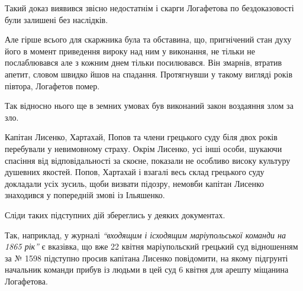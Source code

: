 \documentclass[a4paper,20pt]{report}
\begin{document}
Такий доказ виявився звісно недостатнім і скарги Логафетова по бездоказовості були залишені
без наслідків.

Але гірше всього для скаржника була та обставина, що, пригнічений стан духу
його в момент приведення вироку над ним у виконання, не тільки не послаблювався
але з кожним днем тільки посилювався. Він змарнів, втратив апетит, словом
швидко йшов на спадання. Протягнувши у такому вигляді років півтора, Логафетов
помер.

Так відносно нього ще в земних умовах був виконаний закон воздаяння злом за зло.

Капітан Лисенко, Хартахай, Попов та члени грецького суду біля двох років
перебували у невимовному страху. Окрім Лисенко, усі інші особи, шукаючи
спасіння від відповідальності за скоєне, показали не особливо високу культуру
душевних якостей. Попов, Хартахай і взагалі весь склад грецького суду докладали
усіх зусиль, щоби визвати підозру, немовби капітан Лисенко знаходився у
попередній змові із Ільяшенко.

Сліди таких підступних дій збереглись у деяких документах.

Так, наприклад, у журналі \emph{``входящим і ісходящим маріупольської команди
на 1865 рік''} є вказівка, що вже 22 квітня маріупольский грецький суд відношенням
за № 1598 підступно просив капітана Лисенко повідомити, на якому підгрунті начальник
команди прибув із людьми в цей суд 6 квітня для арешту міщанина Логафетова.
\end{document}
